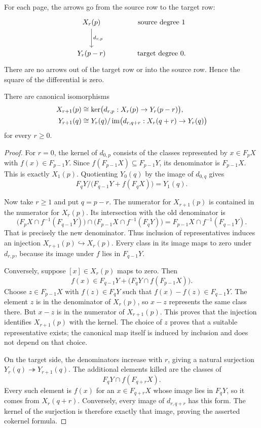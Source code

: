 For each page, the arrows go from the source row to the target row:
\[
\begin{tikzcd}[column sep=large,row sep=large]
X_r(p) \arrow[d,"d_{r,p}"] & \text{source degree }1\\
Y_r(p-r) & \text{target degree }0.
\end{tikzcd}
\]
There are no arrows out of the target row or into the source row. Hence
the square of the differential is zero.

\begin{proposition}\label{s:transition}
There are canonical isomorphisms
\begin{align*}
X_{r+1}(p)&\cong\operatorname{ker}\bigl(d_{r,p}:X_r(p)\to Y_r(p-r)\bigr),\\
Y_{r+1}(q)&\cong
Y_r(q)/\operatorname{im}\bigl(d_{r,q+r}:X_r(q+r)\to Y_r(q)\bigr)
\end{align*}
for every $r\geq0$.
\end{proposition}

\begin{proof}
For $r=0$, the kernel of $d_{0,p}$ consists of the classes represented by
$x\in F_pX$ with $f(x)\in F_{p-1}Y$. Since
$f(F_{p-1}X)\subseteq F_{p-1}Y$, its denominator is $F_{p-1}X$.
This is exactly $X_1(p)$. Quotienting $Y_0(q)$ by the image of $d_{0,q}$
gives
\[
F_qY/\bigl(F_{q-1}Y+f(F_qX)\bigr)=Y_1(q).
\]

Now take $r\geq1$ and put $q=p-r$. The numerator for $X_{r+1}(p)$ is
contained in the numerator for $X_r(p)$. Its intersection with the old
denominator is
\[
\bigl(F_pX\cap f^{-1}(F_{q-1}Y)\bigr)
\cap\bigl(F_{p-1}X\cap f^{-1}(F_qY)\bigr)
=F_{p-1}X\cap f^{-1}(F_{q-1}Y).
\]
That is precisely the new denominator. Thus inclusion of representatives
induces an injection $X_{r+1}(p)\hookrightarrow X_r(p)$.
Every class in its image maps to zero under $d_{r,p}$, because its image
under $f$ lies in $F_{q-1}Y$.

Conversely, suppose $[x]\in X_r(p)$ maps to zero. Then
\[
f(x)\in F_{q-1}Y+\bigl(F_qY\cap f(F_{p-1}X)\bigr).
\]
Choose $z\in F_{p-1}X$ with $f(z)\in F_qY$ such that
$f(x)-f(z)\in F_{q-1}Y$. The element $z$ is in the denominator of
$X_r(p)$, so $x-z$ represents the same class there. But $x-z$ is in the
numerator of $X_{r+1}(p)$. This proves that the injection identifies
$X_{r+1}(p)$ with the kernel.
The choice of $z$ proves that a suitable representative exists; the
canonical map itself is induced by inclusion and does not depend on that
choice.

On the target side, the denominators increase with $r$, giving a natural
surjection $Y_r(q)\twoheadrightarrow Y_{r+1}(q)$. The additional elements
killed are the classes of
\[
F_qY\cap f(F_{q+r}X).
\]
Every such element is $f(x)$ for an $x\in F_{q+r}X$ whose image lies in
$F_qY$, so it comes from $X_r(q+r)$. Conversely, every image of
$d_{r,q+r}$ has this form. The kernel of the surjection is therefore
exactly that image, proving the asserted cokernel formula.
\end{proof}

